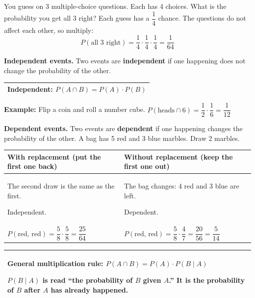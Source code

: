 \documentclass[11pt]{article}
\begin{document}

You guess on 3 multiple-choice questions. Each has 4 choices. What is the probability you get all 3 right?
Each guess has a $\dfrac{1}{4}$ chance. The questions do not affect each other, so multiply:
\[ P(\text{all 3 right}) = \dfrac{1}{4} \cdot \dfrac{1}{4} \cdot \dfrac{1}{4} = \dfrac{1}{64} \]

\vspace{-0.4em}
\textbf{Independent events.} Two events are \textbf{independent} if one happening does not change the probability of the other.

\vspace{0.3em}
\renewcommand{\arraystretch}{1.3}
\begin{tabular}{|>{\raggedright\arraybackslash}p{6.7in}|}\hline
\textbf{Independent:} \qquad $P(A \cap B) = P(A) \cdot P(B)$\\ \hline
\end{tabular}

\vspace{0.3em}
\textbf{Example:} Flip a coin and roll a number cube. \quad $P(\text{heads} \cap 6) = \dfrac{1}{2} \cdot \dfrac{1}{6} = \dfrac{1}{12}$

\vspace{1em}
\textbf{Dependent events.} Two events are \textbf{dependent} if one happening changes the probability of the other. A bag has 5 red and 3 blue marbles. Draw 2 marbles.

\vspace{0.3em}
\begin{tabular}{|>{\raggedright\arraybackslash}p{3.2in}|>{\raggedright\arraybackslash}p{3.3in}|}\hline
\textbf{With replacement} (put the first one back) & \textbf{Without replacement} (keep the first one out)\\ \hline
The second draw is the same as the first.\par Independent. &
The bag changes: 4 red and 3 blue are left.\par Dependent.\\[0.3em] \hline
\rule{0pt}{2.2em}$P(\text{red, red}) = \dfrac{5}{8} \cdot \dfrac{5}{8} = \dfrac{25}{64}$ &
$P(\text{red, red}) = \dfrac{5}{8} \cdot \dfrac{4}{7} = \dfrac{20}{56} = \dfrac{5}{14}$\\[0.9em] \hline
\end{tabular}

\vspace{0.8em}
\begin{tabular}{|>{\raggedright\arraybackslash}p{6.7in}|}\hline
\textbf{General multiplication rule:} \qquad $P(A \cap B) = P(A) \cdot P(B \mid A)$\par\vspace{0.3em}
$P(B \mid A)$ is read ``the probability of $B$ \textbf{given} $A$.'' It is the probability of $B$ after $A$ has already happened.\\ \hline
\end{tabular}
\end{document}
